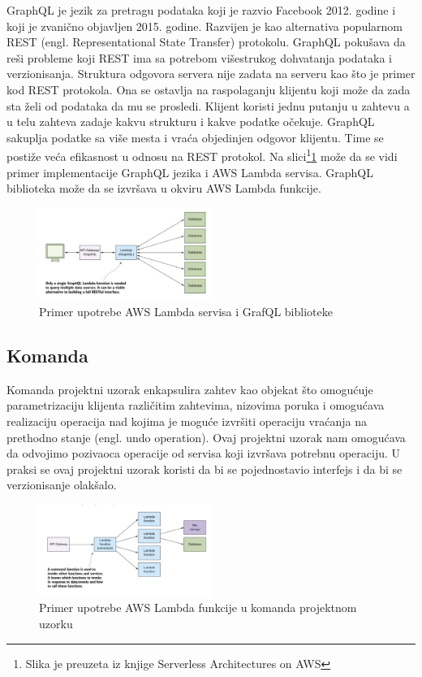 \documentclass[12pt,oneside]{memoir}
\begin{document}
GraphQL je jezik za pretragu podataka koji je razvio Facebook 2012. godine i koji je zvanično objavljen 2015. godine\cite{gql}. Razvijen je kao alternativa popularnom REST (engl. Representational State Transfer) protokolu. GraphQL pokušava da reši probleme koji REST ima sa potrebom višestrukog dohvatanja podataka i verzionisanja. Struktura odgovora servera nije zadata na serveru kao što je primer kod REST protokola. Ona se ostavlja na raspolaganju klijentu koji može da zada sta želi od podataka da mu se prosledi. Klijent koristi jednu putanju u zahtevu a u telu zahteva zadaje kakvu strukturu i kakve podatke očekuje. GraphQL sakuplja podatke sa više mesta i vraća objedinjen odgovor klijentu. Time se postiže veća efikasnost u odnosu na REST protokol. Na slici\footnote{Slika je preuzeta iz knjige Serverless Architectures on AWS}\ref{fig:graphql} može da se vidi primer implementacije GraphQL jezika i AWS Lambda servisa. GraphQL biblioteka može da se izvršava u okviru AWS Lambda funkcije. 

\begin{figure}[!ht]
  \centering
  \includegraphics[width=0.5\textwidth]{Slika 11.png}
  \caption{Primer upotrebe AWS Lambda servisa i GrafQL biblioteke}
  \label{fig:graphql}
\end{figure}

\subsection{Komanda}
Komanda projektni uzorak enkapsulira zahtev kao objekat što omogućuje parametrizaciju klijenta različitim zahtevima, nizovima poruka i omogućava realizaciju operacija nad kojima je moguće izvršiti operaciju vraćanja na prethodno stanje (engl. undo operation)\cite{cdp}. Ovaj projektni uzorak nam omogućava da odvojimo pozivaoca operacije od servisa koji izvršava potrebnu operaciju. U praksi se ovaj projektni uzorak koristi da bi se pojednostavio interfejs i da bi se verzionisanje olakšalo.

\begin{figure}[!ht]
  \centering
  \includegraphics[width=0.5\textwidth]{Slika 12.png}
  \caption{Primer upotrebe AWS Lambda funkcije u komanda projektnom uzorku}
  \label{fig:komanda}
\end{figure}
 
\end{document}
